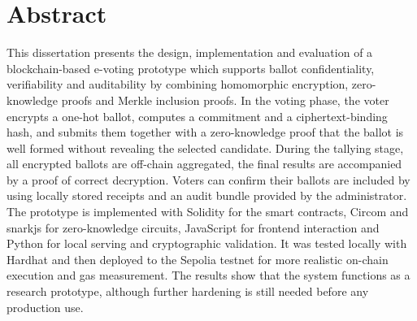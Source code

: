\chapter*{Abstract}
\begingroup
\justifying
\setlength{\parindent}{0pt}
\setlength{\parskip}{0.5\baselineskip}

This dissertation presents the design, implementation and evaluation of a blockchain-based e-voting prototype which supports ballot confidentiality, verifiability and auditability by combining homomorphic encryption, zero-knowledge proofs and Merkle inclusion proofs. In the voting phase, the voter encrypts a one-hot ballot, computes a commitment and a ciphertext-binding hash, and submits them together with a zero-knowledge proof that the ballot is well formed without revealing the selected candidate. During the tallying stage, all encrypted ballots are off-chain aggregated, the final results are accompanied by a proof of correct decryption. Voters can confirm their ballots are included by using locally stored receipts and an audit bundle provided by the administrator. The prototype is implemented with Solidity for the smart contracts, Circom and snarkjs for zero-knowledge circuits, JavaScript for frontend interaction and Python for local serving and cryptographic validation. It was tested locally with Hardhat and then deployed to the Sepolia testnet for more realistic on-chain execution and gas measurement. The results show that the system functions as a research prototype, although further hardening is still needed before any production use.

\endgroup